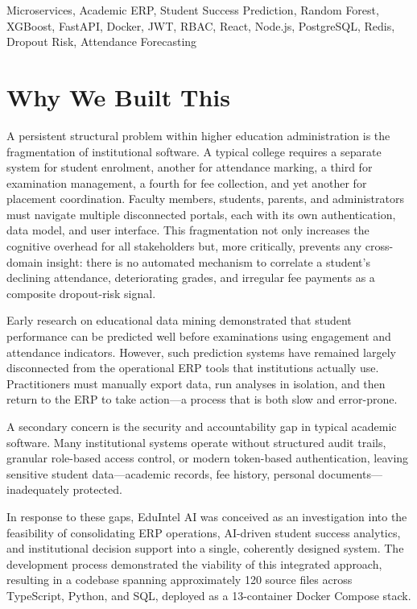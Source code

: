 \documentclass[conference]{IEEEtran}
\begin{document}
\begin{IEEEkeywords}
Microservices, Academic ERP, Student Success Prediction, Random Forest,
XGBoost, FastAPI, Docker, JWT, RBAC, React, Node.js, PostgreSQL, Redis,
Dropout Risk, Attendance Forecasting
\end{IEEEkeywords}

\section{Why We Built This}

A persistent structural problem within higher education administration is the
fragmentation of institutional software. A typical college requires a separate
system for student enrolment, another for attendance marking, a third for
examination management, a fourth for fee collection, and yet another for
placement coordination. Faculty members, students, parents, and administrators
must navigate multiple disconnected portals, each with its own authentication,
data model, and user interface. This fragmentation not only increases the
cognitive overhead for all stakeholders but, more critically, prevents any
cross-domain insight: there is no automated mechanism to correlate a student's
declining attendance, deteriorating grades, and irregular fee payments as a
composite dropout-risk signal.

Early research on educational data mining \cite{romero2010} demonstrated that
student performance can be predicted well before examinations using engagement
and attendance indicators. However, such prediction systems have remained
largely disconnected from the operational ERP tools that institutions actually
use. Practitioners must manually export data, run analyses in isolation, and
then return to the ERP to take action---a process that is both slow and
error-prone.

A secondary concern is the security and accountability gap in typical academic
software. Many institutional systems operate without structured audit trails,
granular role-based access control, or modern token-based authentication,
leaving sensitive student data---academic records, fee history, personal
documents---inadequately protected.

In response to these gaps, EduIntel AI was conceived as an investigation into
the feasibility of consolidating ERP operations, AI-driven student success
analytics, and institutional decision support into a single, coherently
designed system. The development process demonstrated the viability of this
integrated approach, resulting in a codebase spanning approximately 120 source
files across TypeScript, Python, and SQL, deployed as a 13-container Docker
Compose stack.
\end{document}
